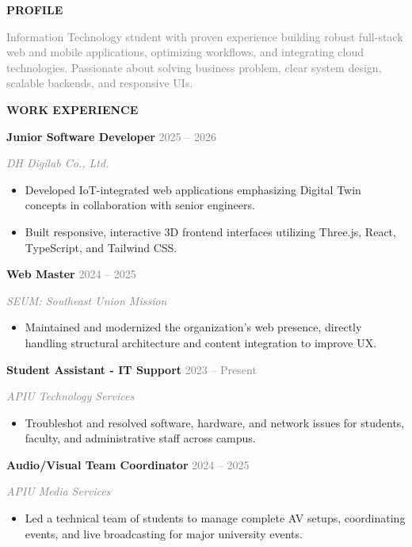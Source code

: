 \documentclass[10pt,a4paper]{article}
\newcommand{\timelineheader}[2]{%
  \vspace{1ex}
  \noindent\hspace{-15pt}\makebox[0pt][c]{\raisebox{-0.15cm}{\tikz\node[circle,fill=mainblue,text=white,inner sep=2pt,minimum size=0.6cm]{\small\faIcon{#1}};}}%
  \hspace{15pt}\textbf{\large\textcolor{mainblue}{\uppercase{#2}}}\par\vspace{0.5ex}%
}
\newcommand{\timelineitemheader}[3]{%
  \vspace{0.8ex}
  \noindent\hspace{-15pt}\makebox[0pt][c]{\raisebox{0.05cm}{\tikz\node[circle,draw=mainblue,thick,fill=white,inner sep=1.5pt]{};}}%
  \hspace{15pt}\textbf{#1} \hfill \textcolor{graytext}{\small #2} \par
  \noindent\textcolor{graytext}{\small\textit{#3}} \par\vspace{0.2ex}%
}
\newcommand{\timelineitemdesc}[1]{%
  \noindent%
  \begin{minipage}{\linewidth}
    \small #1
  \end{minipage}\par\vspace{0.5ex}%
}
\begin{document}
\begin{minipage}[t]{0.66\textwidth}

\begin{tcolorbox}[
  enhanced,
  boxrule=0pt,
  frame hidden,
  colback=white,
  borderline west={1.2pt}{0pt}{graytext},
  sharp corners,
  left=15pt,
  right=0pt,
  top=0pt,
  bottom=0pt,
  boxsep=0pt,
  breakable=true
]

\timelineheader{user}{Profile}
\timelineitemdesc{\textcolor{graytext}{Information Technology student with proven experience building robust full-stack web and mobile applications, optimizing workflows, and integrating cloud technologies. Passionate about solving business problem, clear system design, scalable backends, and responsive UIs.}}

\timelineheader{briefcase}{Work Experience}

\timelineitemheader{Junior Software Developer}{2025 -- 2026}{DH Digilab Co., Ltd.}
\timelineitemdesc{
\begin{itemize}[leftmargin=0.4cm,itemsep=1pt,topsep=0pt]
  \item Developed IoT-integrated web applications emphasizing Digital Twin concepts in collaboration with senior engineers.
  \item Built responsive, interactive 3D frontend interfaces utilizing Three.js, React, TypeScript, and Tailwind CSS.
\end{itemize}
}

\timelineitemheader{Web Master}{2024 -- 2025}{SEUM: Southeast Union Mission}
\timelineitemdesc{
\begin{itemize}[leftmargin=0.4cm,itemsep=1pt,topsep=0pt]
  \item Maintained and modernized the organization's web presence, directly handling structural architecture and content integration to improve UX.
\end{itemize}
}

\timelineitemheader{Student Assistant - IT Support}{2023 -- Present}{APIU Technology Services}
\timelineitemdesc{
\begin{itemize}[leftmargin=0.4cm,itemsep=1pt,topsep=0pt]
  \item Troubleshot and resolved software, hardware, and network issues for students, faculty, and administrative staff across campus.
\end{itemize}
}

\timelineitemheader{Audio/Visual Team Coordinator}{2024 -- 2025}{APIU Media Services}
\timelineitemdesc{
\begin{itemize}[leftmargin=0.4cm,itemsep=1pt,topsep=0pt]
  \item Led a technical team of students to manage complete AV setups, coordinating events, and live broadcasting for major university events.
\end{itemize}
}


\end{tcolorbox}
\end{minipage}
\end{document}
